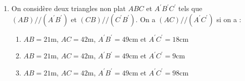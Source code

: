 \documentclass[oneside,twoside]{book}
\begin{document}
\begin{enumerate}
\begin{enumerate}
\end{enumerate}





\item On considère deux triangles non plat $ABC$ et $A^\prime B^\prime C^\prime$ tels que $\left(AB\right)//\left(A^{\prime}B^{\prime}\right)$ et $\left(CB\right)//\left(C^{\prime}B^{\prime}\right)$. On a $\left(AC\right)//\left(A^{\prime}C^{\prime}\right)$ si on a :

\begin{enumerate}


\item\MauvaiseReponse $AB=21\mathrm{m}$, $AC=42\mathrm{m}$, $A^{\prime}B^{\prime}=49\mathrm{cm}$ et $A^{\prime}C^{\prime}=18\mathrm{cm}$

\item\MauvaiseReponse $AB=21\mathrm{m}$, $AC=42\mathrm{m}$, $A^{\prime}B^{\prime}=49\mathrm{cm}$ et $A^{\prime}C^{\prime}=9\mathrm{cm}$

\item\BonneReponse $AB=21\mathrm{m}$, $AC=42\mathrm{m}$, $A^{\prime}B^{\prime}=49\mathrm{cm}$ et $A^{\prime}C^{\prime}=98\mathrm{cm}$

\end{enumerate}


\end{enumerate}
\end{document}
